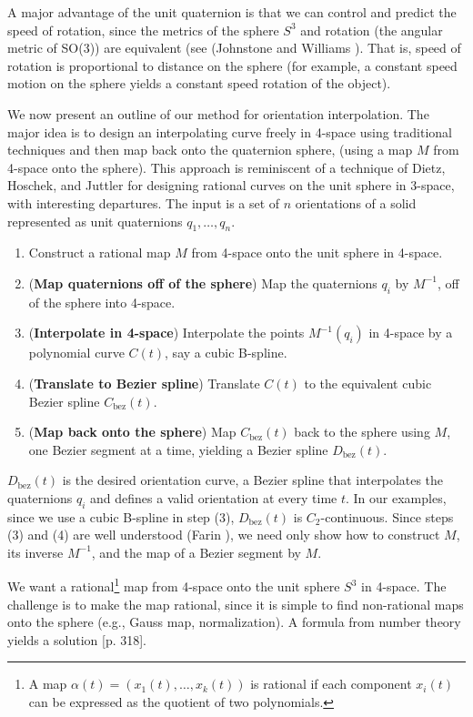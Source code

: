 A major advantage of the unit quaternion is that we can 
control and predict the speed of rotation,
since the metrics of the sphere $S^3$ and rotation (the angular metric of
SO(3)) are equivalent (see (Johnstone and Williams \cite{jjjimbo94a}).
That is, speed of rotation is proportional to distance on the sphere
(for example, a constant speed motion on the sphere yields a constant
speed rotation of the object).

We now present an outline of our method for orientation interpolation.
The major idea is to design an interpolating curve freely in 4-space
using traditional techniques and then map back onto the quaternion sphere,
(using a map $M$ from 4-space onto the sphere).
This approach is reminiscent of a technique of Dietz, Hoschek, and Juttler 
\cite{dietz93} for designing rational curves on the unit sphere in 3-space,
with interesting departures.
The input is a set of $n$ orientations of a solid
represented as unit quaternions $q_1,\ldots,q_n$.

\begin{enumerate}
\item
	Construct a rational map $M$ from 4-space onto the unit sphere in 
	4-space.
\item
	({\bf Map quaternions off of the sphere})
	Map the quaternions $q_i$ by $M^{-1}$,
	off of the sphere into 4-space.
\item
	({\bf Interpolate in 4-space})
	Interpolate the points $M^{-1}(q_i)$ in 4-space
	by a polynomial curve $C(t)$, say a cubic B-spline.
\item
	({\bf Translate to Bezier spline})
	Translate $C(t)$ to the equivalent cubic Bezier spline 
	$C_{\mbox{bez}}(t)$.
\item
	({\bf Map back onto the sphere})
	Map $C_{\mbox{bez}}(t)$ back to the sphere using $M$, 
	one Bezier segment at a time, yielding a  
	Bezier spline $D_{\mbox{bez}}(t)$. 
\end{enumerate}

$D_{\mbox{bez}}(t)$ is the desired orientation curve, a Bezier spline
that interpolates the quaternions $q_i$ and defines a valid orientation
at every time $t$.
In our examples, since we use a cubic B-spline in step (3),
$D_{\mbox{bez}}(t)$ is $C_2$-continuous.
Since steps (3) and (4) are well understood (Farin \cite{farin93}),
we need only show how to construct $M$, its inverse $M^{-1}$,
and the map of a Bezier segment by $M$.

We want a rational\footnote{A map $\alpha(t) = (x_1(t),\ldots,x_k(t))$
	is rational if each component $x_i(t)$ can be expressed
	as the quotient of two polynomials.}
map from 4-space onto the unit sphere $S^3$ in
4-space.
The challenge is to make the map rational,
since it is simple to find non-rational maps onto the sphere 
(e.g., Gauss map, normalization).
A formula from number theory yields a solution
\cite{dickson52}[p. 318].


